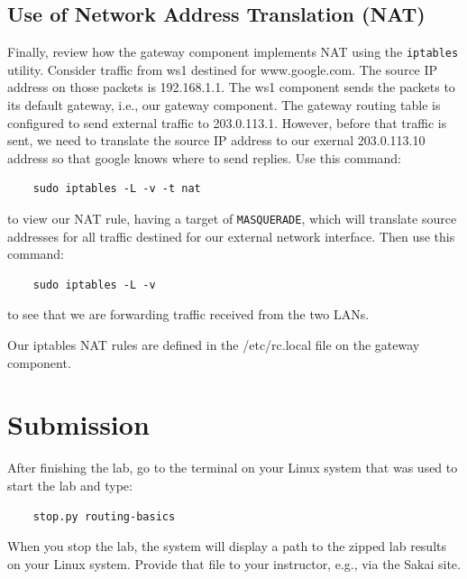 \subsection{Use of Network Address Translation (NAT)}
Finally, review how the gateway component implements NAT using the \texttt{iptables} 
utility.  Consider traffic from ws1 destined for www.google.com. The source IP address
on those packets is 192.168.1.1.  The ws1 component sends the packets to its default
gateway, i.e., our gateway component.  The gateway routing table is configured to
send external traffic to 203.0.113.1.  However, before that traffic is sent, we need
to translate the source IP address to our exernal 203.0.113.10 address so that google knows
where to send replies.  
Use this command:
\begin{verbatim}
    sudo iptables -L -v -t nat
\end{verbatim}
\noindent to view our NAT rule, having a target of \texttt{MASQUERADE}, which will translate
source addresses for all traffic destined for our external network interface.  Then use 
this command:
\begin{verbatim}
    sudo iptables -L -v 
\end{verbatim}
\noindent to see that we are forwarding traffic received from the two LANs. 

Our iptables NAT rules are defined in the /etc/rc.local file on the gateway component.  

\section{Submission}
After finishing the lab, go to the terminal on your Linux system that was used to start the lab and type:
\begin{verbatim}
    stop.py routing-basics
\end{verbatim}
When you stop the lab, the system will display a path to the zipped lab results on your Linux system.  Provide that file to 
your instructor, e.g., via the Sakai site.


